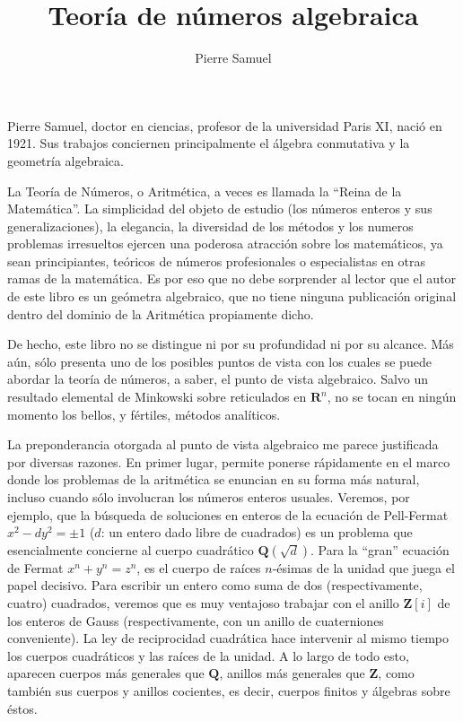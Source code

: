 \documentclass[10pt,oneside,bibtotoc,smallheadings,leqno,a5paper,DIV=12]{scrbook}
\title{Teor\'ia de n\'umeros algebraica}
\author{Pierre Samuel}
\date{}
\newcommand{\RR}{\mathbf{R}}
\newcommand{\QQ}{\mathbf{Q}}
\newcommand{\ZZ}{\mathbf{Z}}
\numberwithin{equation}{section}
\theoremstyle{defi}
\theoremstyle{enonce}
\theoremstyle{rem}
\numberwithin{theorem}{section}
\numberwithin{proposition}{section}
\numberwithin{definition}{section}
\numberwithin{lemma}{section}
\numberwithin{corollary}{section}
\numberwithin{example}{section}
\numberwithin{footnote}{section}%
\begin{document}
\frontmatter

\maketitle

\newpage

\phantom{.}\vfill
\noindent
Pierre Samuel, doctor en ciencias, profesor de la universidad Paris XI, naci\'o en 1921.
Sus trabajos conciernen principalmente el \'algebra conmutativa y la geometr\'ia algebraica.

\vfill\vfill

\tableofcontents


La Teor\'ia de N\'umeros, o Aritm\'etica, a veces es llamada
la ``Reina de la Matem\'atica''. La simplicidad del objeto
de estudio (los n\'umeros enteros y sus generalizaciones), la elegancia,
la diversidad de los m\'etodos y los numeros problemas irresueltos
ejercen una poderosa atracci\'on sobre los matem\'aticos,
ya sean principiantes, te\'oricos de n\'umeros profesionales o
especialistas en otras ramas de la matem\'atica. Es por eso que no
debe sorprender al lector que el autor de este libro es un ge\'ometra
algebraico, que no tiene ninguna publicaci\'on original dentro
del dominio de la Aritm\'etica propiamente dicho.

De hecho, este libro no se distingue ni por su profundidad ni
por su alcance. M\'as a\'un, s\'olo presenta uno de los posibles
puntos de vista con los cuales se puede abordar la teor\'ia de n\'umeros,
a saber, el punto de vista algebraico. Salvo un resultado elemental
de Minkowski sobre reticulados en $\RR^{n}$, no se tocan en ning\'un
momento los bellos, y f\'ertiles, m\'etodos anal\'iticos.

La preponderancia otorgada al punto de vista algebraico me parece
justificada por diversas razones. En primer lugar, permite ponerse
r\'apidamente en el marco donde los problemas de la aritm\'etica
se enuncian en su forma
m\'as natural, incluso cuando s\'olo involucran los n\'umeros enteros
usuales. Veremos, por ejemplo, que la b\'usqueda de soluciones
en enteros de la ecuaci\'on de {Pell-Fermat} $x^{2}-dy^{2}=\pm 1$
($d$: un entero dado libre de cuadrados) es un problema que esencialmente
concierne al cuerpo cuadr\'atico $\QQ(\sqrt{d})$. Para la
``gran'' ecuaci\'on de {Fermat} $x^{n}+y^{n}=z^{n}$, es el cuerpo de
ra\'ices  $n$-\'esimas de la unidad que juega el papel decisivo.
Para escribir un entero como suma de dos (respectivamente, cuatro)
cuadrados, veremos que es muy ventajoso trabajar con el anillo
$\ZZ[i]$ de los enteros de Gauss (respectivamente, con un
anillo de cuaterniones conveniente). La ley de reciprocidad
cuadr\'atica hace intervenir al mismo tiempo los cuerpos cuadr\'aticos y las ra\'ices de
la unidad. A lo largo de todo esto, aparecen cuerpos m\'as generales que
$\QQ$, anillos m\'as generales que $\ZZ$, como tambi\'en sus cuerpos y
anillos cocientes, es decir, cuerpos finitos y \'algebras
sobre \'estos.
\end{document}
